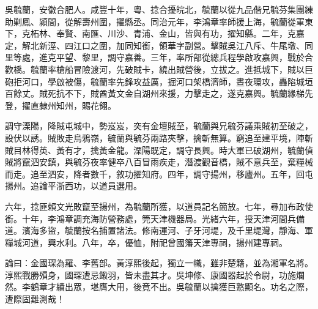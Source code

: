 \begin{pinyinscope}
吳毓蘭，安徽合肥人。咸豐十年，粵、捻合擾皖北，毓蘭以從九品偕兄毓芬集團練助剿鳳、潁間，從解壽州圍，擢縣丞。同治元年，李鴻章率師援上海，毓蘭從軍東下，克柘林、奉賢、南匯、川沙、青浦、金山，皆與有功，擢知縣。二年，克嘉定，解北新涇、四江口之圍，加同知銜，領華字副營。擊賊吳江八斥、牛尾墩、同里等處，進克平望、黎里，調守嘉善。三年，率所部從總兵程學啟攻嘉興，戰於合歡橋。毓蘭率槍船冒險渡河，先破賊卡，繞出賊營後，立拔之。進抵城下，賊以巨砲拒河口，學啟被傷，毓蘭率先鋒攻益厲，掘河口架橋濟師，晝夜環攻，轟陷城垣百餘丈。賊死抗不下，賊酋黃文金自湖州來援，力擊走之，遂克嘉興。毓蘭緣梯先登，擢直隸州知州，賜花翎。

調守溧陽，降賊屯城中，勢岌岌，突有金壇賊至，毓蘭與兄毓芬議乘賊初至破之，設伏以誘。賊敗走烏鴉嶺，毓蘭與毓芬兩路夾擊，擒斬無算。窮追至建平境，陣斬賊目林得英、黃有才，擒黃金龍。溧陽既定，調守長興。時大軍已破湖州，毓蘭偵賊將竄泗安鎮，與毓芬夜率健卒八百冒雨疾走，潛渡觀音橋，賊不意兵至，棄糧械而走。追至泗安，降者數千，敘功擢知府。四年，調守揚州，移廬州。五年，回屯揚州。追論平浙西功，以道員選用。

六年，捻匪賴文光敗竄至揚州，為毓蘭所獲，以道員記名簡放。七年，尋加布政使銜。十年，李鴻章調充海防營務處，筦天津機器局。光緒六年，授天津河間兵備道。濱海多盜，毓蘭按名捕置諸法。修南運河、子牙河堤，及千里堤灣，靜海、軍糧城河道，興水利。八年，卒，優恤，附祀曾國籓天津專祠，揚州建專祠。

論曰：金國琛為羅、李舊部。黃淳熙後起，獨立一幟，雖非楚籍，並為湘軍名將。淳熙戰勝殞身，國琛遭忌鎩羽，皆未盡其才。吳坤修、康國器起於令尉，功施爛然。李鶴章才績出眾，堪膺大用，後竟不出。吳毓蘭以擒獲巨憝顯名。功名之際，遭際固難測哉！


\end{pinyinscope}